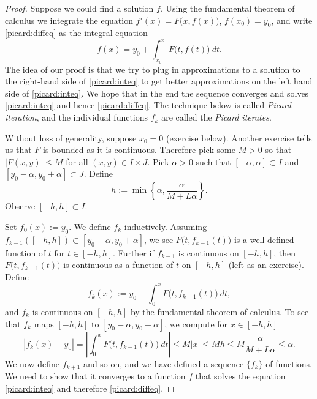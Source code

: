 \documentclass[12pt]{book}
\newcommand{\abs}[1]{\left\lvert {#1} \right\rvert}
\newcommand{\myindex}[1]{#1\index{#1}}
\theoremstyle{plain}
\theoremstyle{remark}
\theoremstyle{definition}
\theoremstyle{exercise}
\theoremstyle{example}
\begin{document}
\begin{proof}
Suppose we could find a solution $f$.  Using the fundamental
theorem of calculus we integrate the equation 
$f'(x) = F\bigl(x,f(x)\bigr)$, $f(x_0) = y_0$, and write \eqref{picard:diffeq}
as the integral equation
\begin{equation} \label{picard:inteq}
f(x) = y_0 + \int_{x_0}^x F\bigl(t,f(t)\bigr)~dt .
\end{equation}
The idea of our proof is that we try to plug in approximations to
a solution to the right-hand side of \eqref{picard:inteq} to get better approximations on the left
hand side of  \eqref{picard:inteq}.  We hope that in the end the sequence 
converges and solves
\eqref{picard:inteq} and hence \eqref{picard:diffeq}.
The technique below is called \emph{\myindex{Picard iteration}},
and the individual functions $f_k$ are called the 
\emph{Picard iterates}.

Without loss of generality, suppose $x_0 = 0$ (exercise below).
Another
exercise tells us that $F$ is bounded as it is continuous.
Therefore pick some $M > 0$ so that 
$\abs{F(x,y)} \leq M$ for all $(x,y) \in I\times J$.
Pick $\alpha > 0$ such that
$[-\alpha,\alpha] \subset I$ and $[y_0-\alpha, y_0 + \alpha] \subset J$.
Define
\begin{equation*}
h := \min \left\{ \alpha, \frac{\alpha}{M+L\alpha} \right\} .
\end{equation*}
Observe
$[-h,h] \subset I$.

Set $f_0(x) := y_0$.
We define $f_k$ inductively.
Assuming $f_{k-1}([-h,h]) \subset [y_0-\alpha,y_0+\alpha]$,
we see 
$F\bigl(t,f_{k-1}(t)\bigr)$ is
a well defined function of $t$ for $t \in [-h,h]$.
Further if $f_{k-1}$ is continuous
on $[-h,h]$, then
$F\bigl(t,f_{k-1}(t)\bigr)$ is
continuous as
a function of $t$ on $[-h,h]$ (left as an exercise).
Define
\begin{equation*}
f_k(x) := y_0+ \int_{0}^x F\bigl(t,f_{k-1}(t)\bigr)~dt ,
\end{equation*}
and $f_k$ is continuous on $[-h,h]$ by the fundamental theorem of calculus.
To see that $f_k$ maps $[-h,h]$ to $[y_0-\alpha,y_0+\alpha]$, we compute for
$x \in [-h,h]$
\begin{equation*}
\abs{f_k(x) - y_0} = 
\abs{\int_{0}^x F\bigl(t,f_{k-1}(t)\bigr)~dt }
\leq
M\abs{x}
\leq
Mh
\leq
M
\frac{\alpha}{M+L\alpha}
\leq \alpha .
\end{equation*}
We now define $f_{k+1}$ and so on, and
we have defined a sequence $\{ f_k \}$ of functions.  We need
to show that it converges to a function $f$ that solves
the equation \eqref{picard:inteq} and therefore \eqref{picard:diffeq}.


\end{proof}
\end{document}

